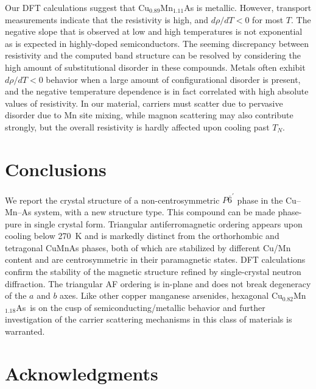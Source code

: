 \documentclass[10pt,doublespacing,edeposit]{uiucthesis2020}
\newcommand*{\cumnas}{Cu$_{0.82}$Mn$_{1.18}$As}
\begin{document}
\begin{mainmatter}
Our DFT calculations suggest that Cu$_{0.89}$Mn$_{1.11}$As is metallic. However, transport measurements indicate that the resistivity is high, and $d\rho/dT < 0$ for most $T$. 
The negative slope that is observed at low and high temperatures is not exponential as is expected in highly-doped semiconductors.\cite{Chapman1963}
The seeming discrepancy between resistivity and the computed band structure can be resolved by considering the high amount of substitutional disorder in these compounds.
Metals often exhibit $d\rho/dT < 0$ behavior when a large amount of configurational disorder is present,\cite{Elk1979} and the negative temperature dependence is in fact correlated with high absolute values of resistivity.\cite{Mooij1973} 
In our material, carriers must scatter due to pervasive disorder due to Mn site mixing, while magnon scattering may also contribute strongly, but the overall resistivity is hardly affected upon cooling past $T_N$.

\section{Conclusions}

We report the crystal structure of a non-centrosymmetric $P\overline{6}^\prime$ phase in the Cu--Mn--As system, with a new structure type. This compound can be made phase-pure in single crystal form. Triangular antiferromagnetic ordering appears upon cooling below 270~K and is markedly distinct from the orthorhombic and tetragonal CuMnAs phases, both of which are stabilized by different Cu/Mn content and are centrosymmetric in their paramagnetic states. DFT calculations confirm the stability of the magnetic structure refined by single-crystal neutron diffraction. The triangular AF ordering is in-plane and does not break degeneracy of the $a$ and $b$ axes.  Like other copper manganese arsenides, hexagonal \cumnas\ is on the cusp of semiconducting/metallic behavior and further investigation of the carrier scattering mechanisms in this class of materials is warranted.


\section{Acknowledgments}


\end{mainmatter}
\end{document}
